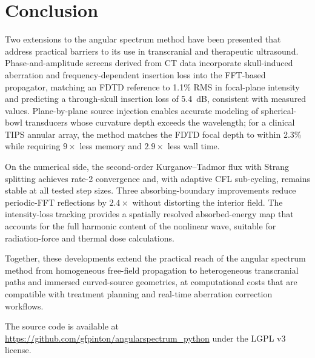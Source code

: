 \documentclass[11pt]{article}
\begin{document}
\section{Conclusion}
\label{sec:conclusion}

Two extensions to the angular spectrum method have been presented that
address practical barriers to its use in transcranial and therapeutic
ultrasound.  Phase-and-amplitude screens derived from CT data
incorporate skull-induced aberration and frequency-dependent insertion
loss into the FFT-based propagator, matching an FDTD reference to
1.1\% RMS in focal-plane intensity and predicting a through-skull
insertion loss of \SI{5.4}{\deci\bel}, consistent with measured
values.  Plane-by-plane source injection enables accurate modeling of
spherical-bowl transducers whose curvature depth exceeds the
wavelength; for a clinical TIPS annular array, the method matches the
FDTD focal depth to within 2.3\% while requiring $9\times$ less
memory and $2.9\times$ less wall time.

On the numerical side, the second-order Kurganov--Tadmor flux with
Strang splitting achieves rate-2 convergence and, with adaptive CFL
sub-cycling, remains stable at all tested step sizes.  Three
absorbing-boundary improvements reduce periodic-FFT reflections by
$2.4\times$ without distorting the interior field.  The intensity-loss
tracking provides a spatially resolved absorbed-energy map that
accounts for the full harmonic content of the nonlinear wave, suitable
for radiation-force and thermal dose calculations.

Together, these developments extend the practical reach of the angular
spectrum method from homogeneous free-field propagation to
heterogeneous transcranial paths and immersed curved-source
geometries, at computational costs that are compatible with treatment
planning and real-time aberration correction workflows.

The source code is available at
\url{https://github.com/gfpinton/angularspectrum_python} under the
LGPL v3 license.
\end{document}
